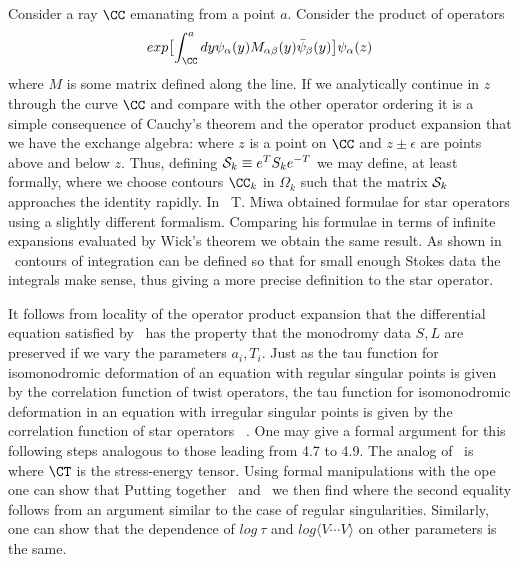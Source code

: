 Consider a ray $\CC$ emanating from a point $a$. Consider the product 
of operators 
$$exp\bigl[\int^a_\CC dy\psi_\alpha(y) M_{\alpha\beta}(y)\bar\psi_\beta(y)
\bigr]\psi_\alpha(z)$$
where $M$ is some matrix defined along the line. 
If we analytically continue in $z$ through 
the curve $\CC$ and compare with the other operator ordering 
it is a simple consequence of Cauchy's theorem and the 
operator product expansion that we have the exchange algebra:
\eqn{}
where $z$ is a point on $\CC$ and $z\pm\epsilon$ are points above and 
below $z$. Thus, defining ${\cal S}_k\equiv e^T S_k e^{-T}$ we may define, 
at least formally, 
\eqn{}
where we choose contours $\CC_k$ in $\Omega_k$ such that the 
matrix ${\cal S}_k$ approaches the identity rapidly. 
In \miwai\ T. Miwa obtained formulae for star operators using 
a slightly different formalism. Comparing his formulae in 
terms of infinite expansions evaluated by Wick's theorem we 
obtain the same result.
As shown in \miwai\ contours of integration can be defined so 
that for small enough Stokes data the integrals make 
sense, thus giving a more precise definition to the star 
operator.

It follows from locality of the operator product 
expansion that the differential equation 
satisfied by \corstar\ has the property that the monodromy
data $S,L$ are preserved if we vary the parameters $a_i,T_i$. 
Just as the tau function for isomonodromic deformation of 
an equation with regular singular points is given by the 
correlation function of twist operators, the tau function for 
isomonodromic deformation in an equation with irregular singular
points
is given by the correlation function
of star operators \miwai\ . One may give a formal 
argument for this following steps analogous to those 
leading from 4.7 to 4.9. The analog of \corrii\ is
\eqn{}
where $\CT$ is the stress-energy tensor.
Using formal manipulations with the ope one can show that
\eqn{}
Putting together \stress\ and \gobpe\ we then find
\eqn{}
where the second equality follows from an argument similar to 
the case of regular singularities. Similarly, one can show
that the dependence
of $log~\tau$ and $log\langle V\cdots V\rangle$ on other 
parameters is the same.

